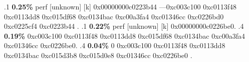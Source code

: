 \begin{profile}
{.1 \textbf{ 0.25\%} perf             [unknown]              [k] 0x00000000c0223b44\newline {} ---0xc003c100\newline {} 0xc0113f48\newline {} 0xc0113dd8\newline {} 0xc015df68\newline {} 0xc0134bac\newline {} 0xc00a3fa4\newline {} 0xc01346cc\newline {} 0xc0226bd0\newline {} 0xc0225cf4\newline {} 0xc0223b44\newline {} . 
.1 \textbf{ 0.22\%} perf             [unknown]              [k] 0x00000000c0226be0. 
.4 \textbf{0.19\%} 0xc003c100\newline {} 0xc0113f48\newline {} 0xc0113dd8\newline {} 0xc015df68\newline {} 0xc0134bac\newline {} 0xc00a3fa4\newline {} 0xc01346cc\newline {} 0xc0226be0. 
.4 \textbf{0.04\%} 0\newline {} 0xc003c100\newline {} 0xc0113f48\newline {} 0xc0113dd8\newline {} 0xc0134bac\newline {} 0xc015d3b8\newline {} 0xc015d0e8\newline {} 0xc01346cc\newline {} 0xc0226be0\newline {} . 
}
\end{profile}
